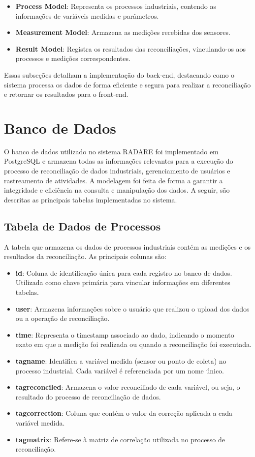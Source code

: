 \begin{itemize} \item \textbf{Process Model}: Representa os processos industriais, contendo as informações de variáveis medidas e parâmetros. \item \textbf{Measurement Model}: Armazena as medições recebidas dos sensores. \item \textbf{Result Model}: Registra os resultados das reconciliações, vinculando-os aos processos e medições correspondentes. \end{itemize}

Essas subseções detalham a implementação do back-end, destacando como o sistema processa os dados de forma eficiente e segura para realizar a reconciliação e retornar os resultados para o front-end.

\section{Banco de Dados}

O banco de dados utilizado no sistema RADARE foi implementado em PostgreSQL e armazena todas as informações relevantes para a execução do processo de reconciliação de dados industriais, gerenciamento de usuários e rastreamento de atividades. A modelagem foi feita de forma a garantir a integridade e eficiência na consulta e manipulação dos dados. A seguir, são descritas as principais tabelas implementadas no sistema.

\subsection{Tabela de Dados de Processos}

A tabela que armazena os dados de processos industriais contém as medições e os resultados da reconciliação. As principais colunas são:

\begin{itemize}
    \item \textbf{id}: Coluna de identificação única para cada registro no banco de dados. Utilizada como chave primária para vincular informações em diferentes tabelas.
    \item \textbf{user}: Armazena informações sobre o usuário que realizou o upload dos dados ou a operação de reconciliação.
    \item \textbf{time}: Representa o timestamp associado ao dado, indicando o momento exato em que a medição foi realizada ou quando a reconciliação foi executada.
    \item \textbf{tagname}: Identifica a variável medida (sensor ou ponto de coleta) no processo industrial. Cada variável é referenciada por um nome único.
    \item \textbf{tagreconciled}: Armazena o valor reconciliado de cada variável, ou seja, o resultado do processo de reconciliação de dados.
    \item \textbf{tagcorrection}: Coluna que contém o valor da correção aplicada a cada variável medida.
    \item \textbf{tagmatrix}: Refere-se à matriz de correlação utilizada no processo de reconciliação.
\end{itemize}

